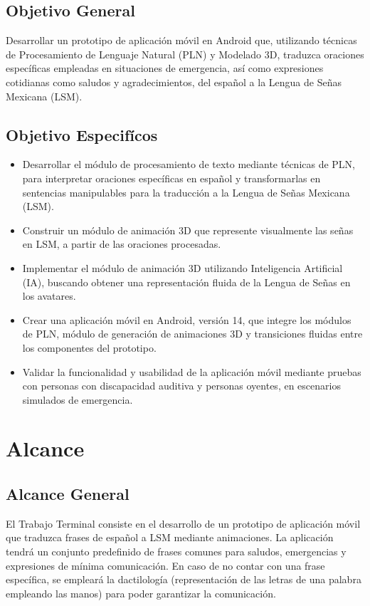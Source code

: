 \subsection{Objetivo General}
Desarrollar un prototipo de aplicación móvil en Android que, utilizando técnicas de Procesamiento de Lenguaje Natural (PLN) y Modelado 3D, traduzca oraciones específicas empleadas en situaciones de emergencia, así como expresiones cotidianas como saludos y agradecimientos, del español a la Lengua de Señas Mexicana (LSM).

\subsection{Objetivo Especifícos}
\begin{itemize}
    \item Desarrollar el módulo de procesamiento de texto mediante técnicas de PLN, para interpretar oraciones específicas en español y transformarlas en sentencias manipulables para la traducción a la Lengua de Señas Mexicana (LSM).
    \item Construir un módulo de animación 3D que represente visualmente las señas en LSM, a partir de las oraciones procesadas.
    \item Implementar el módulo de animación 3D utilizando Inteligencia Artificial (IA), buscando obtener una representación fluida de la Lengua de Señas en los avatares.
    \item Crear una aplicación móvil en Android, versión 14, que integre los módulos de PLN, módulo de generación de animaciones 3D y transiciones fluidas entre los componentes del prototipo.
    \item Validar la funcionalidad y usabilidad de la aplicación móvil mediante pruebas con personas con discapacidad auditiva y personas oyentes, en escenarios simulados de emergencia.
\end{itemize}

\section{Alcance}
\subsection{Alcance General}
El Trabajo Terminal consiste en el desarrollo de un prototipo de aplicación móvil que traduzca frases de español a LSM mediante animaciones. La aplicación tendrá un conjunto predefinido de frases comunes para saludos, emergencias y expresiones de mínima comunicación. En caso de no contar con una frase específica, se empleará la dactilología (representación de las letras de una palabra empleando las manos) para poder garantizar la comunicación.

